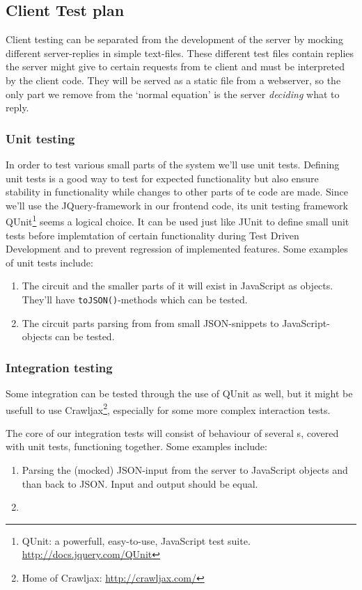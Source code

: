 \subsection{Client Test plan}
Client testing can be separated from the development of the server by mocking different server-replies in simple text-files. These different test files contain replies the server might give to certain requests from te client and must be interpreted by the client code. They will be served as a static file from a webserver, so the only part we remove from the `normal equation' is the server \textit{deciding} what to reply. 

\subsubsection{Unit testing}
In order to test various small parts of the system we'll use unit tests. Defining unit tests is a good way to test for expected functionality but also ensure stability in functionality while changes to other parts of te code are made. Since we'll use the JQuery-framework in our frontend code, its unit testing framework QUnit\footnote{QUnit: a powerfull, easy-to-use, JavaScript test suite. \url{http://docs.jquery.com/QUnit}} seems a logical choice. It can be used just like JUnit to define small unit tests before implemtation of certain functionality during Test Driven Development and to prevent regression of implemented features. Some examples of unit tests include:
\begin{enumerate}
	\item The circuit and the smaller parts of it will exist in JavaScript as objects. They'll have \verb|toJSON()|-methods which can be tested.
	\item The circuit parts parsing from from small JSON-snippets to JavaScript-objects can be tested.
\end{enumerate}

\subsubsection{Integration testing}
Some integration can be tested through the use of QUnit as well, but it might be usefull to use Crawljax\footnote{Home of Crawljax: \url{http://crawljax.com/}}, especially for some more complex interaction tests.

The core of our integration tests will consist of behaviour of several s, covered with unit tests, functioning together. Some examples include:
\begin{enumerate}
	\item Parsing the (mocked) JSON-input from the server to JavaScript objects and than back to JSON. Input and output should be equal.
	\item 
\end{enumerate}

